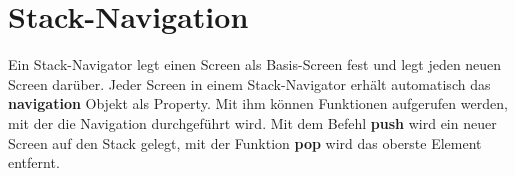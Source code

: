 \section{Stack-Navigation}
Ein Stack-Navigator legt einen Screen als Basis-Screen fest und legt jeden neuen Screen darüber.
Jeder Screen in einem Stack-Navigator erhält automatisch das \textbf{navigation} Objekt als
Property. Mit ihm können Funktionen aufgerufen werden, mit der die Navigation durchgeführt wird. Mit
dem Befehl \textbf{push} wird ein neuer Screen auf den Stack gelegt, mit der Funktion \textbf{pop}
wird das oberste Element entfernt.





